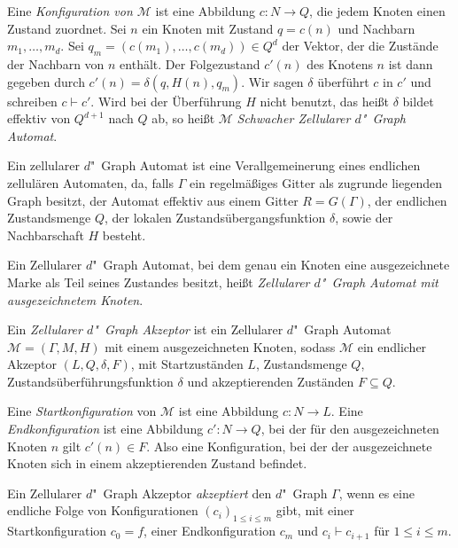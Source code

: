 \documentclass[11pt]{article}
\newcommand{\defWord}[1]{\emph{#1}}
\begin{document}
\begin{definition}[Konfiguration]
	Eine \defWord{Konfiguration von $\mathcal{M}$} ist eine Abbildung $c : N \rightarrow Q$, die jedem Knoten einen Zustand zuordnet.
	Sei $n$ ein Knoten mit Zustand $q = c\left(n\right)$ und Nachbarn $m_1, \dots, m_d$. 
	Sei $q_m = \left( c\left( m_1\right), \dots , c\left(m_d\right)\right) \in Q^d$ der Vektor, der die Zustände der Nachbarn von $n$ enthält. 
	Der Folgezustand $c'\left( n\right)$ des Knotens $n$ ist dann gegeben durch $c'\left(n\right) = \delta\left(q, H\left(n\right),q_m \right) $. 
	Wir sagen $\delta$ überführt $c$ in $c'$ und schreiben $c \vdash c'$.
	Wird bei der Überführung $H$ nicht benutzt, das heißt $\delta$ bildet effektiv von $Q^{d+1}$ nach $Q$ ab, so heißt $\mathcal{M}$ \defWord{Schwacher Zellularer $d$"~Graph Automat}.
\end{definition}


\begin{bemerkung}
	Ein zellularer $d$"~Graph Automat ist eine Verallgemeinerung eines endlichen zellulären Automaten, da, falls $\Gamma$ ein regelmäßiges Gitter als zugrunde liegenden Graph besitzt, der Automat effektiv aus einem Gitter $R = G(\Gamma)$, der endlichen Zustandsmenge $Q$, der lokalen Zustandsübergangsfunktion $\delta$, sowie der Nachbarschaft $H$ besteht.
\end{bemerkung}

\begin{definition}[Akzeptanz]
	Ein Zellularer $d$"~Graph Automat, bei dem genau ein Knoten eine ausgezeichnete Marke als Teil seines Zustandes  besitzt, heißt \defWord{Zellularer $d$"~Graph Automat mit ausgezeichnetem Knoten}.
	
	Ein \defWord{Zellularer $d$"~Graph Akzeptor} ist ein Zellularer $d$"~Graph Automat $\mathcal{M} = \left(\Gamma, M, H \right)$ mit einem ausgezeichneten Knoten, sodass $\mathcal{M}$ ein endlicher Akzeptor $\left(L, Q, \delta, F\right)$, mit Startzuständen $L$, Zustandsmenge $Q$, Zustandsüberführungsfunktion $\delta$ und akzeptierenden Zuständen $F \subseteq Q$.
	
	Eine \defWord{Startkonfiguration} von $\mathcal{M}$ ist eine Abbildung $c : N \rightarrow L$. 
	Eine \defWord{Endkonfiguration} ist eine Abbildung $c' : N \rightarrow Q$, bei der für den ausgezeichneten Knoten $\hat{n}$ gilt $c'\left(n\right) \in F$. 
	Also eine Konfiguration, bei der der ausgezeichnete Knoten sich in einem akzeptierenden Zustand befindet.
	
	Ein Zellularer $d$"~Graph Akzeptor \defWord{akzeptiert} den $d$"~Graph $\Gamma$, wenn es eine endliche Folge von Konfigurationen $\left(c_i\right)_{1 \le i \le m}$ gibt, mit einer Startkonfiguration $c_0 = f$, einer Endkonfiguration $c_m$ und $c_i \vdash c_{i+1}$ für $1 \le i \le m$.
\end{definition}
\end{document}

